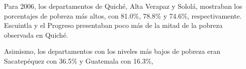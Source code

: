 Para 2006, los departamentos de Quiché, Alta Verapaz y Sololá, mostraban los porcentajes de pobreza más altos, con 81.0\%, 78.8\% y 74.6\%, respectivamente. Escuintla y el Progreso presentaban poco más de la mitad de la pobreza observada en Quiché. 

Asimismo, los departamentos con los niveles más bajos de pobreza eran Sacatepéquez con 36.5\% y Guatemala con  16.3\%, 